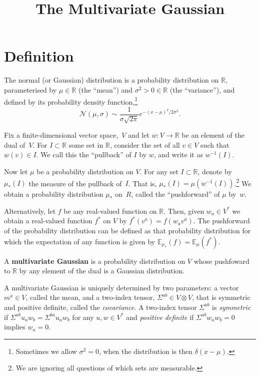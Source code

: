 \documentclass[10pt, a4paper, twocolumn]{article}
\title{The Multivariate Gaussian}
\newcommand{\R}{\mathbb{R}}
\newcommand{\E}{\mathbb{E}}
\newcommand{\N}{\mathcal{N}}
\newcommand{\defn}[1]{\textbf{#1}}
\begin{document}
\maketitle

\section{Definition}

The normal (or Gaussian) distribution is a probability distribution on $\R$,
parameterised by $\mu\in\R$ (the “mean”) and $\sigma^2>0 \in\R$ (the “variance”),
and defined by its probability density function,\footnote{Sometimes we allow
  $\sigma^2=0$, when the distribution is then $\delta(x-\mu)$.}
\begin{equation*}
  \N(\mu, \sigma) \sim \frac{1}{\sigma\sqrt{2\pi}} e^{-(x-\mu)^2/2\sigma^2}.
\end{equation*}

Fix a finite-dimensional vector space,~$V$ and let $w:V\to\R$ be an element of
the dual of~$V$. For $I\subset\R$ some set in $\R$, consider the set of all $v\in V$
such that $w(v)\in I$. We call this the “pullback” of $I$ by $w$, and write it as
$w^{-1}(I)$. 

Now let $\mu$ be a probability distribution on $V$. For any set $I\subset\R$, denote by
$\mu_*(I)$ the measure of the pullback of~$I$. That is, $\mu_*(I) =
\mu(w^{-1}(I))$.\footnote{We are ignoring all questions of which sets are
  measurable.} We obtain a probability distribution $\mu_*$ on~$R$, called the
“pushforward” of $\mu$ by~$w$.

Alternatively, let $f$ be any real-valued function on $\R$. Then, given $w_a\in
V^*$ we obtain a real-valued function $f^*$ on $V$ by $f^*(v^a) = f(w_a
v^a)$. The pushforward of the probability distribution can be defined as that
probability distribution for which the expectation of any function is given by
$\E_{\mu_*}(f) = \E_\mu(f^*)$.

A \defn{multivariate Gaussian} is a probability distribution on $V$ whose
pushfoward to $\R$ by any element of the dual is a Gaussian distribution.

A multivariate Gaussian is uniquely determined by two parameters: a vector $m^a\in
V$, called the mean, and a two-index tensor, $\Sigma^{ab}\in V\otimes V$, that is symmetric
and positive definite, called the \emph{covariance}. A two-index tensor $\Sigma^{ab}$
is \emph{symmetric} if $\Sigma^{ab}u_a w_b = \Sigma^{ba} u_a w_b$ for any $u, w\in V^*$ and
\emph{positive definite} if $\Sigma^{ab}w_a w_b = 0$ implies $w_a = 0$.
\end{document}
